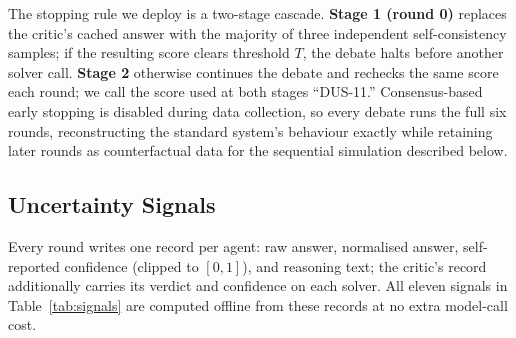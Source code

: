 \documentclass{llncs}
\begin{document}
The stopping rule we deploy is a two-stage cascade. \textbf{Stage 1 (round 0)} replaces the critic's cached answer with the majority of three independent self-consistency samples; if the resulting score clears threshold $T$, the debate halts before another solver call. \textbf{Stage 2} otherwise continues the debate and rechecks the same score each round; we call the score used at both stages ``DUS-11.'' Consensus-based early stopping is disabled during data collection, so every debate runs the full six rounds, reconstructing the standard system's behaviour exactly while retaining later rounds as counterfactual data for the sequential simulation described below.

\subsection{Uncertainty Signals}

Every round writes one record per agent: raw answer, normalised answer, self-reported confidence (clipped to $[0,1]$), and reasoning text; the critic's record additionally carries its verdict and confidence on each solver. All eleven signals in Table~\ref{tab:signals} are computed offline from these records at no extra model-call cost. 
\end{document}
